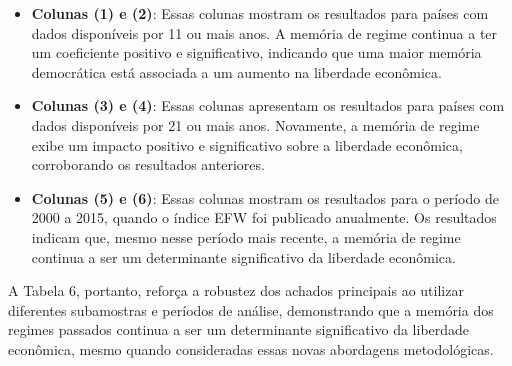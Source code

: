 \begin{itemize}
    \item \textbf{Colunas (1) e (2)}: Essas colunas mostram os resultados para países com dados disponíveis por 11 ou mais anos. A memória de regime continua a ter um coeficiente positivo e significativo, indicando que uma maior memória democrática está associada a um aumento na liberdade econômica.
    \item \textbf{Colunas (3) e (4)}: Essas colunas apresentam os resultados para países com dados disponíveis por 21 ou mais anos. Novamente, a memória de regime exibe um impacto positivo e significativo sobre a liberdade econômica, corroborando os resultados anteriores.
    \item \textbf{Colunas (5) e (6)}: Essas colunas mostram os resultados para o período de 2000 a 2015, quando o índice EFW foi publicado anualmente. Os resultados indicam que, mesmo nesse período mais recente, a memória de regime continua a ser um determinante significativo da liberdade econômica.
\end{itemize}

A Tabela 6, portanto, reforça a robustez dos achados principais ao utilizar diferentes subamostras e períodos de análise, demonstrando que a memória dos regimes passados continua a ser um determinante significativo da liberdade econômica, mesmo quando consideradas essas novas abordagens metodológicas.


